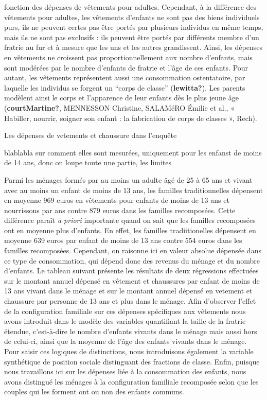 \documentclass[
  12pt,
]{book}
\begin{document}
fonction des dépenses de vêtements pour adultes. Cependant, à la
différence des vêtements pour adultes, les vêtements d'enfants ne sont
pas des biens individuels purs, ils ne peuvent certes pas être portés
par plusieurs individus en même temps, mais ils ne sont pas exclusifs :
ils peuvent être portés par différents membre d'un fratrie au fur et à
mesure que les uns et les autres grandissent. Ainsi, les dépenses en
vêtements ne croissent pas proportionnellement aux nombre d'enfants,
mais sont modérées par le nombre d'enfants de fratrie et l'âge de ces
enfants. Pour autant, les vêtements représentent aussi une consommation
ostentatoire, par laquelle les individus se forgent un ``corps de
classe'' (\textbf{lewitta?}). Les parents modèlent ainsi le corps et
l'apparence de leur enfants dès le plus jeune âge
(\textbf{courtMartine?}, MENNESSON Christine, SALAMéRO Émilie et al., «
Habiller, nourrir, soigner son enfant : la fabrication de corps de
classes », Rech).

\begin{encadre}{Les dépenses de vetements et chaussure dans l'enquête}

blablabla sur comment elles sont mesurées, uniquement pour les enfanst de moins de 14 ans, donc on loupe toute une partie, les limites

\end{encadre}

Parmi les ménages formés par au moins un adulte âgé de 25 à 65 ans et
vivant avec au moins un enfant de moins de 13 ans, les familles
traditionnelles dépensent en moyenne 969 euros en vêtements pour enfants
de moins de 13 ans et nourrissons par ans contre 879 euros dans les
familles recomposées. Cette différence paraît \emph{a priori} importante
quand on sait que les familles recomposées ont en moyenne plus
d'enfants. En effet, les familles tradiitionelles dépensent en moyenne
639 euros par enfant de moins de 13 ans contre 554 euros dans les
familles recomposées. Cependant, on raisonne ici en valeur absolue
dépensée dans ce type de consommation, qui dépend donc des revenus du
ménage et du nombre d'enfants. Le tableau suivant présente les résultats
de deux régressions effectuées sur le montant annuel dépensé en vêtement
et chaussures par enfant de moins de 13 ans vivant dans le ménage et sur
le montant annuel dépensé en vetement et chaussure par personne de 13
ans et plus dans le ménage. Afin d'observer l'effet de la configuration
familiale sur ces dépenses spécifiques aux vêtements nous avons
introduit dans le modèle des variables quantifiant la taille de la
fratrie étendue, c'est-à-dire le nombre d'enfants vivants dans le ménage
mais aussi hors de celui-ci, ainsi que la moyenne de l'âge des enfants
vivants dans le ménage. Pour saisir ces logiques de distinctions, nous
introduisons également la variable synthétique de position sociale
distinguant des fractions de classe. Enfin, puisque nous travaillons ici
sur les dépenses liée à la consommation des enfants, nous avons
distingué les ménages à la configuration familiale recomposée selon que
les couples qui les forment ont ou non des enfants communs.
\end{document}
